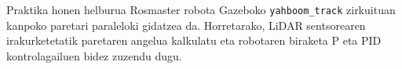 Praktika honen helburua Rosmaster robota Gazeboko \texttt{yahboom\_track} zirkuituan kanpoko paretari paraleloki gidatzea da. Horretarako, LiDAR sentsorearen irakurketetatik paretaren angelua kalkulatu eta robotaren biraketa P eta PID kontrolagailuen bidez zuzendu dugu.
